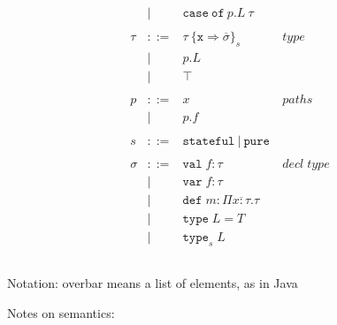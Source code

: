 \documentclass{article}
\newcommand{\keywadj}[1]{\mathtt{#1}}
\newcommand{\keyw}[1]{\keywadj{#1}~}
\begin{document}
\[\begin{array}{lll}
\begin{array}{lllr}
& | & \keyw{case} \keyw{of} p.L~\tau &\\
&&\\
\tau & ::= & \tau~\{\texttt{x} \Rightarrow \overline{\sigma}\}_{s} & type \\
& | & p.L &\\
& | & \top &\\
&&\\
p & ::= & x & paths \\
& | & p.f &\\
&&\\
s & ::= & \keyw{stateful} | ~\keyw{pure} \\
&&\\
\sigma & ::= & \texttt{val} \; f:\tau & decl \; type\\
       & |   & \texttt{var} \; f:\tau \\
       & |   & \texttt{def} \; m:\Pi \overline{x{:}\tau} . \tau \\
       & |   & \texttt{type} \; L = T &\\
       & |   & \texttt{type}_{s} \; L &\\
&&\\
\end{array}
\end{array}
\]

Notation: overbar means a list of elements, as in Java

Notes on semantics:
\end{document}
